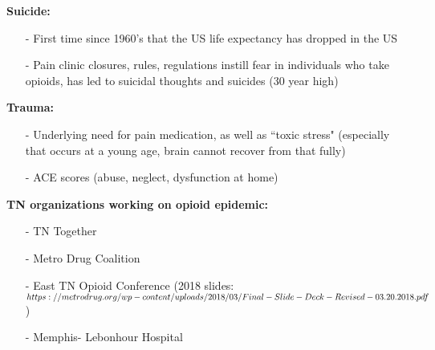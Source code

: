 \documentclass[12pt]{article}
\begin{document}
\textbf{Suicide:}
\begin{itemize}
\item[-] First time since 1960's that the US life expectancy has dropped in the US 
\item[-] Pain clinic closures, rules, regulations instill fear in individuals who take opioids, has led to suicidal thoughts and suicides (30 year high)
\end{itemize}

\textbf{Trauma:} 
\begin{itemize}
\item[-] Underlying need for pain medication, as well as ``toxic stress" (especially that occurs at a young age, brain cannot recover from that fully)
\item[-] ACE scores (abuse, neglect, dysfunction at home) 
\end{itemize}

\textbf{TN organizations working on opioid epidemic:}
\begin{itemize}
\item[-] TN Together
\item[-] Metro Drug Coalition
\item[-] East TN Opioid Conference (2018 slides: $https://metrodrug.org/wp-content/uploads/2018/03/\\
Final-Slide-Deck-Revised-03.20.2018.pdf$)
\item[-] Memphis- Lebonhour Hospital 
\end{itemize}
\end{document}
